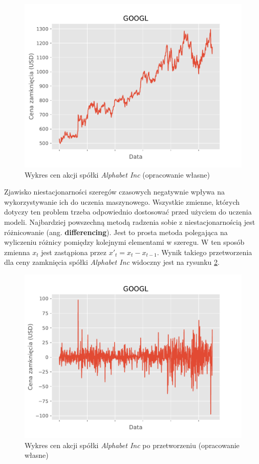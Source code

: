 \documentclass[a4paper, twoside, 11pt, openright]{article}
\begin{document}
\begin{figure}[H]
\centering 
\includegraphics[scale=0.9]{img/adjusted_close.pdf}
\caption{Wykres cen akcji spółki \textit{Alphabet Inc} (opracowanie własne)}
\label{non_stationary_adjusted_close}
\end{figure}

Zjawisko niestacjonarności szeregów czasowych negatywnie wpływa na wykorzystywanie ich do uczenia maszynowego. Wszystkie zmienne, których dotyczy ten problem trzeba odpowiednio dostosować przed użyciem do uczenia modeli. Najbardziej powszechną metodą radzenia sobie z niestacjonarnością jest różnicowanie (ang. \textbf{differencing}). Jest to prosta metoda polegająca na wyliczeniu różnicy pomiędzy kolejnymi elementami w szeregu. W ten sposób zmienna $x_t$ jest zastąpiona przez $x'_t=x_t-x_{t-1}$. Wynik takiego przetworzenia dla ceny zamknięcia spółki \textit{Alphabet Inc} widoczny jest na rysunku \ref{stationary_adjusted_close}.

\begin{figure}[H]
\centering 
\includegraphics[scale=0.9]{img/adjusted_close_stationary.pdf}
\caption{Wykres cen akcji spółki \textit{Alphabet Inc} po przetworzeniu (opracowanie własne)}
\label{stationary_adjusted_close}
\end{figure}
\end{document}
